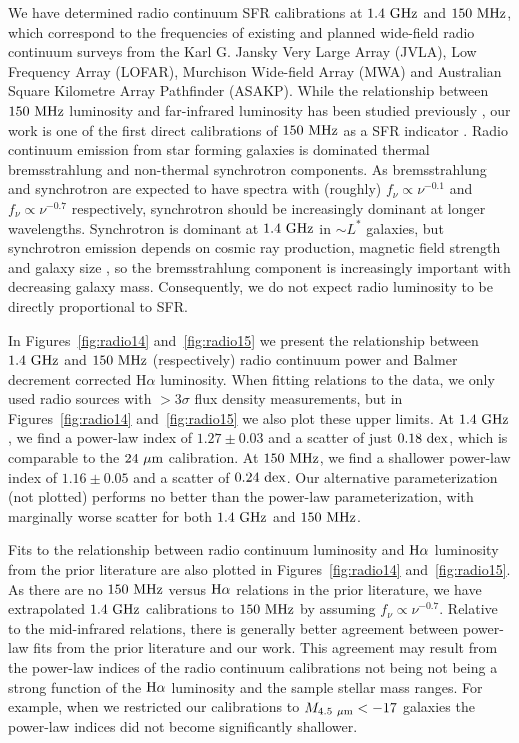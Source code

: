 \documentclass[preprint]{aastex61}
\begin{document}
We have determined radio continuum SFR calibrations at $1.4~{\rm GHz}$ and $150~{\rm MHz}$, which correspond to the frequencies of existing and planned wide-field radio continuum surveys from the Karl G. Jansky Very Large Array (JVLA), Low Frequency Array (LOFAR), Murchison Wide-field Array (MWA) and Australian Square Kilometre Array Pathfinder (ASAKP).  While the relationship between $150~{\rm MHz}$ luminosity and far-infrared luminosity has been studied previously \citep[e.g.,][]{cox88}, our work is one of the first direct calibrations of $150~{\rm MHz}$ as a SFR indicator \citep[e.g.,][G{\"u}rkan et al. in prep.]{cal17}. Radio continuum emission from star forming galaxies is dominated thermal bremsstrahlung and non-thermal synchrotron components. As bremsstrahlung and synchrotron are expected to have spectra with (roughly) $f_\nu \propto \nu^{-0.1}$ and $f_\nu \propto \nu^{-0.7}$ respectively, synchrotron should be increasingly dominant at longer wavelengths. Synchrotron is dominant at $1.4~{\rm GHz}$ in $\sim L^*$ galaxies, but synchrotron emission depends on cosmic ray production, magnetic field strength and galaxy size \citep[e.g.,][and references therein]{bel03}, so the bremsstrahlung component is increasingly important with decreasing galaxy mass. Consequently, we do not expect radio luminosity to be directly proportional to SFR.

In Figures~\ref{fig:radio14} and~\ref{fig:radio15} we present the relationship between $1.4~{\rm GHz}$ and $150~{\rm MHz}$ (respectively) radio continuum power and Balmer decrement corrected H$\alpha$ luminosity. When fitting relations to the data, we only used radio sources with $>3\sigma$ flux density measurements, but in Figures~\ref{fig:radio14} and~\ref{fig:radio15} we also plot these upper limits. At $1.4~{\rm GHz}$, we find a power-law index of $1.27\pm 0.03$ and a scatter of just $0.18~{\rm dex}$, which is comparable to the $24~{\rm \mu m}$ calibration. At $150~{\rm MHz}$, we find a shallower power-law index of $1.16 \pm 0.05$ and a scatter of $0.24~{\rm dex}$. Our alternative parameterization (not plotted) performs no better than the power-law parameterization, with marginally worse scatter for both $1.4~{\rm GHz}$ and $150~{\rm MHz}$. 

Fits to the relationship between radio continuum luminosity and ${\rm H\alpha}$ luminosity from the prior literature are also plotted in Figures~\ref{fig:radio14} and~\ref{fig:radio15}. As there are no $150~{\rm MHz}$ versus ${\rm H\alpha}$ relations in the prior literature, we have extrapolated $1.4~{\rm GHz}$ calibrations to $150~{\rm MHz}$ by assuming $f_\nu \propto \nu^{-0.7}$. Relative to the mid-infrared relations, there is generally better agreement between power-law fits from the prior literature and our work. This agreement may result from the power-law indices of the radio continuum calibrations not being not being a strong function of the ${\rm H\alpha}$ luminosity and the sample stellar mass ranges. For example, when we restricted our calibrations to $M_{\rm 4.5~\mu m}<-17$ galaxies the power-law indices did not become significantly shallower. 
\end{document}
